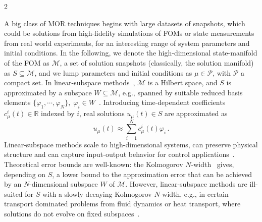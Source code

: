\documentclass{article}
\newcommand{\M}{\mathcal{M}}                                %
\newcommand{\R}{\mathbb{R}}                                 %
\newcommand{\state}{x}
\begin{document}
\begin{multicols}{2}

A big class of MOR techniques begins with large datasets of snapshots, which could be solutions from high-fidelity simulations of FOMs or state measurements from real world experiments, for an interesting range of system parameters and initial conditions. In the following, we denote the high-dimensional state-manifold of the FOM as $\M$, a set of solution snapshots (classically, the solution manifold) as $S \subseteq \M$, and we lump parameters and initial conditions as $\mu \in \mathcal{P}$, with $\mathcal{P}$ a compact set. %
%
%
In linear-subspace methods~\cite{Hesthaven2015,Quarteroni2015}, $\M$ is a Hilbert space, and $S$ is approximated by a subspace $W \subseteq \M$, e.g., spanned by suitable reduced basis elements $\{\varphi_1,\cdots,\varphi_N\},\; \varphi_i \in W$~\cite{Sirovich1987}. Introducing time-dependent coefficients $c_{\mu}^i(t)\in \R$ indexed by $i$, real solutions $u_{\mu}(t) \in S$ are approximated as 
\begin{equation}\label{eq:subspace-approximation}
    u_{\mu}(t) \approx \sum_{i=1}^N c_{\mu}^i(t)\varphi_i\,. 
\end{equation}
Linear-subspace methods scale to high-dimensional systems, can preserve physical structure and can capture input-output behavior for control applications~\cite{Volkwein2013,Besselink2013}. Theoretical error bounds are well-known: the Kolmogorov $N$-width~\cite{Pinkus1985} gives, depending on $S$, a lower bound to the approximation error that can be achieved by an $N$-dimensional subspace $W$ of $\M$. However, linear-subspace methods are ill-suited for $S$ with a slowly decaying Kolmogorov $N$-width, e.g., in certain transport dominated problems from fluid dynamics or heat transport, where solutions do not evolve on fixed subspaces~\cite{Ohlberger2013}. %


\end{multicols}
\end{document}
